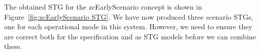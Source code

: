 \documentclass[british,compsoc]{IEEEtran}
\newcommand{\noun}[1]{\textsc{#1}}
\begin{document}

The obtained STG for the \textsf{zcEarlyScenario} concept is shown
in Figure~\ref{fig:zcEarlyScenario STG}. We have now produced three
scenario STGs, one for each operational mode in this system. However,
we need to ensure they are correct both for the specification and
as STG models before we can combine these.

%
%
%
\end{document}
